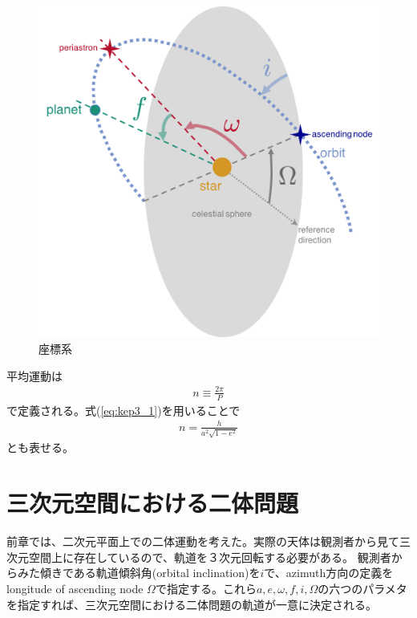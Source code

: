 \begin{figure}[]
 \begin{center}
 \includegraphics[bb=0 0 474 461,width=1.0\linewidth]{fig/orbele.png}
\end{center}
	\caption{座標系}
	\label{fig:ellip}
\end{figure} 

平均運動は
\begin{align}
    n \equiv \frac{2 \pi}{P}
\end{align}
で定義される。式(\ref{eq:kep3_1})を用いることで
\begin{align}
\label{eq:mean_motion}
    n = \frac{h}{a^2 \sqrt{1-e^2}}
\end{align}
とも表せる。

\section{三次元空間における二体問題 \label{ss:threedtwobody}}

前章では、二次元平面上での二体運動を考えた。実際の天体は観測者から見て三次元空間上に存在しているので、軌道を３次元回転する必要がある。
観測者からみた傾きである軌道傾斜角(orbital inclination)を$i$で、azimuth方向の定義をlongitude of ascending node $\Omega$で指定する。これら$a,e,\omega, f, i, \Omega$の六つのパラメタを指定すれば、三次元空間における二体問題の軌道が一意に決定される。

